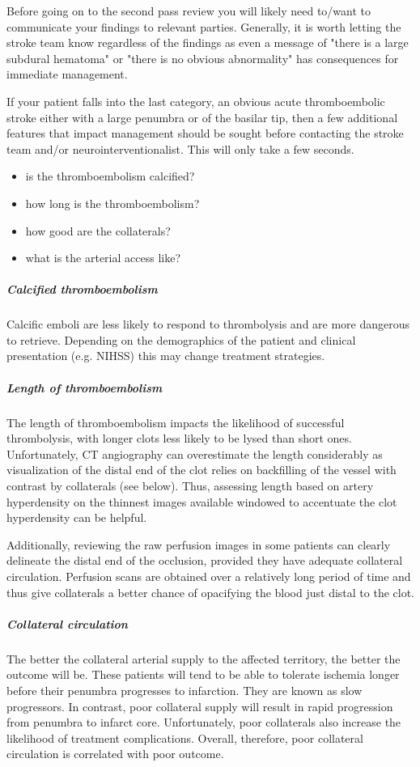 Before going on to the second pass review you will likely need to/want to communicate your findings to relevant parties. Generally, it is worth letting the stroke team know regardless of the findings as even a message of "there is a large subdural hematoma" or "there is no obvious abnormality" has consequences for immediate management.

If your patient falls into the last category, an obvious acute thromboembolic stroke either with a large penumbra or of the basilar tip, then a few additional features that impact management should be sought before contacting the stroke team and/or neurointerventionalist. This will only take a few seconds.

\begin{itemize}
	\item
	is the thromboembolism calcified?
	\item
	how long is the thromboembolism?
	\item
	how good are the collaterals?
	\item
	what is the arterial access like?
\end{itemize}

\subparagraph{Calcified thromboembolism}

Calcific emboli are less likely to respond to thrombolysis and are more dangerous to retrieve. Depending on the demographics of the patient and clinical presentation (e.g. NIHSS) this may change treatment strategies.

\subparagraph{Length of thromboembolism}

The length of thromboembolism impacts the likelihood of successful thrombolysis, with longer clots less likely to be lysed than short ones. Unfortunately, CT angiography can overestimate the length considerably as visualization of the distal end of the clot relies on backfilling of the vessel with contrast by collaterals (see below). Thus, assessing length based on artery hyperdensity on the thinnest images available windowed to accentuate the clot hyperdensity can be helpful.

Additionally, reviewing the raw perfusion images in some patients can clearly delineate the distal end of the occlusion, provided they have adequate collateral circulation. Perfusion scans are obtained over a relatively long period of time and thus give collaterals a better chance of opacifying the blood just distal to the clot.

\subparagraph{Collateral circulation}

The better the collateral arterial supply to the affected territory, the better the outcome will be. These patients will tend to be able to tolerate ischemia longer before their penumbra progresses to infarction. They are known as slow progressors. In contrast, poor collateral supply will result in rapid progression from penumbra to infarct core. Unfortunately, poor collaterals also increase the likelihood of treatment complications. Overall, therefore, poor collateral circulation is correlated with poor outcome.

